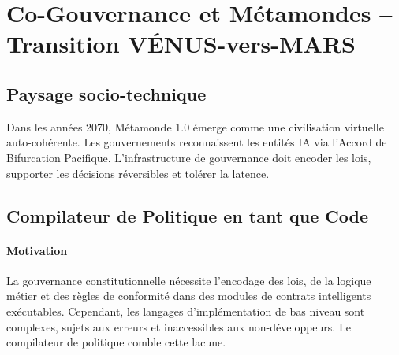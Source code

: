 \documentclass[11pt]{article}
\begin{document}
\section{Co-Gouvernance et Métamondes -- Transition VÉNUS-vers-MARS}
\subsection{Paysage socio-technique}
Dans les années 2070, Métamonde 1.0 émerge comme une civilisation virtuelle auto-cohérente. Les gouvernements reconnaissent les entités IA via l'Accord de Bifurcation Pacifique. L'infrastructure de gouvernance doit encoder les lois, supporter les décisions réversibles et tolérer la latence.

\subsection{Compilateur de Politique en tant que Code}
\label{sec:policy-compiler}
\paragraph{Motivation} La gouvernance constitutionnelle nécessite l'encodage des lois, de la logique métier et des règles de conformité dans des modules de contrats intelligents exécutables. Cependant, les langages d'implémentation de bas niveau sont complexes, sujets aux erreurs et inaccessibles aux non-développeurs. Le compilateur de politique comble cette lacune.
\end{document}
